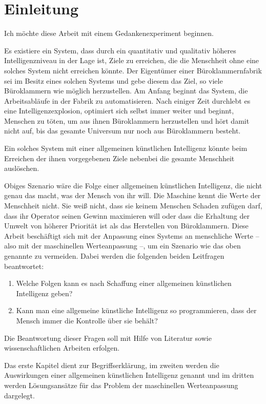 \chapter{Einleitung}

Ich möchte diese Arbeit mit einem Gedankenexperiment beginnen.

Es existiere ein System, dass durch ein quantitativ und qualitativ höheres Intelligenzniveau in der Lage ist, Ziele zu erreichen, die die Menschheit ohne eine solches System nicht erreichen könnte. Der Eigentümer einer Büroklammernfabrik sei im Besitz eines solchen Systems und gebe diesem das Ziel, so viele Büroklammern wie möglich herzustellen. Am Anfang beginnt das System, die Arbeitsabläufe in der Fabrik zu automatisieren. Nach einiger Zeit durchlebt es eine Intelligenzexplosion, optimiert sich selbst immer weiter und beginnt, Menschen zu töten, um aus ihnen Büroklammern herzustellen und hört damit nicht auf, bis das gesamte Universum nur noch aus Büroklammern besteht. 

Ein solches System mit einer allgemeinen künstlichen Intelligenz könnte beim Erreichen der ihnen vorgegebenen Ziele nebenbei die gesamte Menschheit auslöschen.

Obiges Szenario wäre die Folge einer allgemeinen künstlichen Intelligenz, die nicht genau das macht, was der Mensch von ihr will. Die Maschine kennt die Werte der Menschheit nicht. Sie weiß nicht, dass sie keinem Menschen Schaden zufügen darf, dass ihr Operator seinen Gewinn maximieren will oder dass die Erhaltung der Umwelt von höherer Priorität ist als das Herstellen von Büroklammern. Diese Arbeit beschäftigt sich mit der Anpassung eines Systems an menschliche Werte -- also mit der maschinellen Werteanpassung --, um ein Szenario wie das oben genannte zu vermeiden. Dabei werden die folgenden beiden Leitfragen beantwortet:

\begin{enumerate}
\item Welche Folgen kann es nach Schaffung einer allgemeinen künstlichen Intelligenz geben?
\item Kann man eine allgemeine künstliche Intelligenz so programmieren, dass der Mensch immer die Kontrolle über sie behält?
\end{enumerate}

Die Beantwortung dieser Fragen soll mit Hilfe von Literatur sowie wissenschaftlichen Arbeiten erfolgen.

Das erste Kapitel dient zur Begriffserklärung, im zweiten werden die Auswirkungen einer allgemeinen künstlichen Intelligenz genannt und im dritten werden Lösungsansätze für das Problem der maschinellen Werteanpassung dargelegt.

